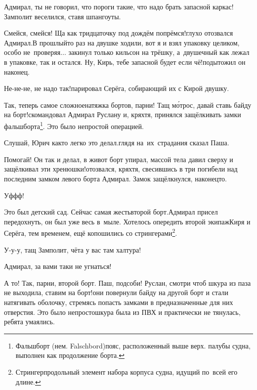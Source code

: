 \diagdash Адмирал, ты не говорил, что пороги такие, что надо брать запасной каркас!\mdash Замполит веселился, ставя шпангоуты.

\diagdash Смейся, смейся! Ща как тридцаточку под дождём попрёмся!\mdash глухо отозвался Адмирал.\mdash В прошлый\sdash то раз на двушке ходили, вот я и взял упаковку целиком, особо не~проверяя$\ldots$ закинул только кильсон на трёшку, а~двушечный как лежал в упаковке, так и остался. Ну, Кирь, тебе запасной будет если чё!\mdash подытожил он наконец.

\diagdash Не-не-не, не надо так!\mdash парировал Серёга, собирающий их с Кирой двушку.

\diagdash Так, теперь самое сложное\mdash натяжка бортов, парни! Тащ м\'{о}трос, давай ставь байду на борт!\mdash скомандовал Адмирал Руслану и, кряхтя, принялся защёлкивать замки фальшборта\footnote{Фальшборт (нем. Falschbord)\mdash пояс, расположенный выше верх. палубы судна, выполнен как продолжение борта\cite{МорскойСправочник}.}. Это было непростой операцией.

\diagdash Слушай, Юрич как\sdash то легко это делал.\mdash глядя на~их~страдания сказал Паша.

\diagdash Помогай! Он так и делал, в живот борт упирал, массой тела давил сверху и защёлкивал эти хренюшки!\mdash отозвался, кряхтя, свесившись в три погибели над последним замком левого борта Адмирал. Замок защёлкнулся, наконец\sdash то.

\diagdash Уф\sdash ф\sdash ф!

\renewcommand*{\thefootnote}{\fnsymbol{footnote}}
\setcounter{footnote}{0}
\diagdash Это был детский сад. Сейчас самая жесть\mdash второй борт.\mdash Адмирал присел передохнуть, он был уже весь в~мыле. Хотелось опередить второй экипаж\mdash Киря и Серёга, тем временем, ещё копошились со стрингерами\footnote{Стрингер\mdash продольный элемент набора корпуса судна, идущий по~всей его длине\cite{МорскойСправочник}.}. 

\diagdash У-у-у, тащ Замполит, чёта у вас там халтура!

\diagdash Адмирал, за вами таки не угнаться!

\diagdash А то! Так, парни, второй борт. Паш, подсоби! Руслан, смотри чтоб шкура из паза не выходила, ставим на борт!\mdash они повернули байду на другой борт и стали натягивать оболочку, стремясь попасть замками в предназначенные для них отверстия. Это было непросто\mdash шкура была из ПВХ и практически не тянулась, ребята умаялись.

